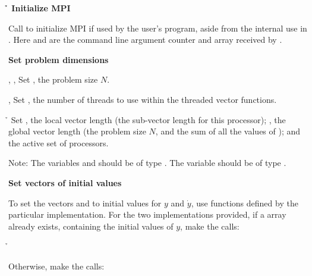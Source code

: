 \begin{Steps}
  
\item 
  {\bf {\p} {\h} Initialize MPI}

  Call  to initialize MPI if used by
  the user's program, aside from the internal use in {\nvecp}.  
  Here  and  are the command line argument 
  counter and array received by .
  
\item
  {\bf Set problem dimensions}

  {\s, \omp, \pt} Set , the problem size $N$.

  {\omp, \pt} Set , the number of threads to use within
  the threaded vector functions.

  {\p} {\h} Set , the local vector length (the sub-vector
  length for this processor); , the global vector length (the
  problem size $N$, and the sum of all the values of );
  and the active set of processors.
    
  Note: The variables  and  should be of type
  .  The variable  should be of type .

\item
  {\bf Set vectors of initial values}
 
  To set the vectors  and  to initial values for $y$ and $\dot{y}$, 
  use functions defined by the particular {\nvector} implementation. 
  For the two {\nvector} implementations provided, if a  array  
  already exists, containing the initial values of $y$, make the calls:

  {\s} 

  {\omp} 

  {\pt} 

  {\p} 

  {\h} 

  Otherwise, make the calls:

  {\s} 

  {\omp} 

  {\pt} 


\end{Steps}
